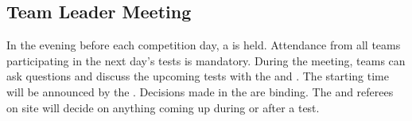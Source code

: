









\subsection{Team Leader Meeting}
\label{sec:rules:teamleadermeeting}
In the evening before each competition day, a \TLM{} is held. 
Attendance from all teams participating in the next day's tests is mandatory. 
During the meeting, teams can ask questions and discuss the upcoming tests with the  and . 
The starting time will be announced by the . 
Decisions made in the \TLM{} are binding. 
The  and referees on site will decide on anything coming up during or after a test.

